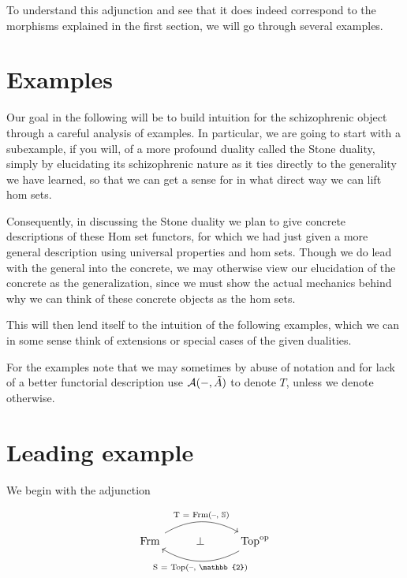 \documentclass[12pt,a4paper]{article}
\DeclareMathOperator{\Hom}{Hom}
\DeclareMathOperator{\Set}{Set}
\DeclareMathOperator{\Frm}{Frm}
\DeclareMathOperator{\Top}{Top}
\DeclareMathOperator{\op}{op}
\def\HomA{\ensuremath\mathcal{A}}
\def\t{\ensuremath\tilde}
\begin{document}
To understand this adjunction and see that it does indeed correspond to the morphisms explained in the first section, we will go through several examples.

\section{Examples}
Our goal in the following will be to build intuition for the schizophrenic object through a careful analysis of examples. In particular, we are going to start with a subexample, if you will, of a more profound duality called the Stone duality, simply by elucidating its schizophrenic nature as it ties directly to the generality we have learned, so that we can get a sense for in what direct way we can lift hom sets.

Consequently, in discussing the Stone duality we plan to give concrete descriptions of these Hom set functors, for which we had just given a more general description using universal properties and hom sets. Though we do lead with the general into the concrete, we may otherwise view our elucidation of the concrete as the generalization, since we must show the actual mechanics behind why we can think of these concrete objects as the hom sets.

This will then lend itself to the intuition of the following examples, which we can in some sense think of extensions or special cases of the given dualities. 

For the examples note that we may sometimes by abuse of notation and for lack of a better functorial description use $\HomA(-,\t A)$ to denote $T$, unless we denote otherwise.
\section{Leading example}


We begin with the adjunction 

\[\begin{tikzcd}
	{\Frm} & \bot & {\Top^{\op}}
	\arrow["{\text{T = $\Frm$(--, $\mathbb{S}$)}}" , bend left, from=1-1, to=1-3]
	\arrow["{\text{S = $\Top$(--, $\mathbb{2}$)}}", bend left, from=1-3, to=1-1]
\end{tikzcd}\]
\end{document}
